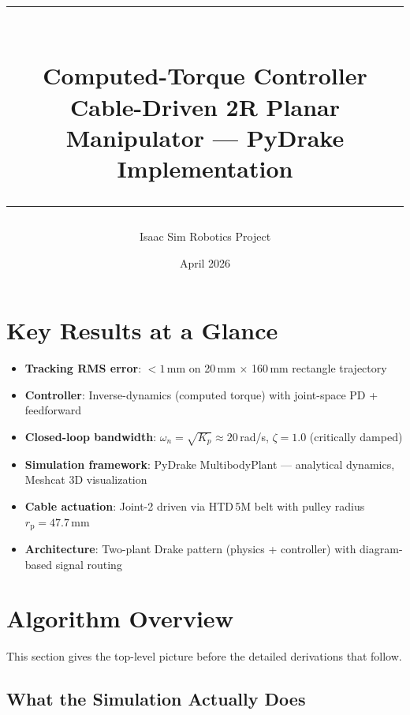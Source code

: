 \documentclass[11pt,a4paper]{article}
\title{%
    \textcolor{drakeblue}{\rule{\linewidth}{1.5pt}}\\[0.4cm]
    {\Huge\bfseries Computed-Torque Controller}\\[0.3cm]
    {\Large\textcolor{drakecyan}{Cable-Driven 2R Planar Manipulator --- PyDrake Implementation}}\\[0.2cm]
    \textcolor{drakeblue}{\rule{\linewidth}{1.5pt}}
}
\author{Isaac Sim Robotics Project}
\date{April 2026}
\newcommand{\rp}{r_{\mathrm{p}}}
\begin{document}
\maketitle
\thispagestyle{empty}

\section*{Key Results at a Glance}

\begin{resultbox}
\begin{itemize}[leftmargin=1.5em]
    \item \textbf{Tracking RMS error}: $< 1$\,mm on 20\,mm $\times$ 160\,mm rectangle trajectory
    \item \textbf{Controller}: Inverse-dynamics (computed torque) with joint-space PD + feedforward
    \item \textbf{Closed-loop bandwidth}: $\omega_n = \sqrt{K_p} \approx 20$\,rad/s, $\zeta = 1.0$ (critically damped)
    \item \textbf{Simulation framework}: PyDrake MultibodyPlant --- analytical dynamics, Meshcat 3D visualization
    \item \textbf{Cable actuation}: Joint-2 driven via HTD\,5M belt with pulley radius $\rp = 47.7$\,mm
    \item \textbf{Architecture}: Two-plant Drake pattern (physics + controller) with diagram-based signal routing
\end{itemize}
\end{resultbox}

\tableofcontents
\newpage

\section{Algorithm Overview}
\label{sec:overview}

This section gives the top-level picture before the detailed derivations that follow.

\subsection{What the Simulation Actually Does}
\end{document}
